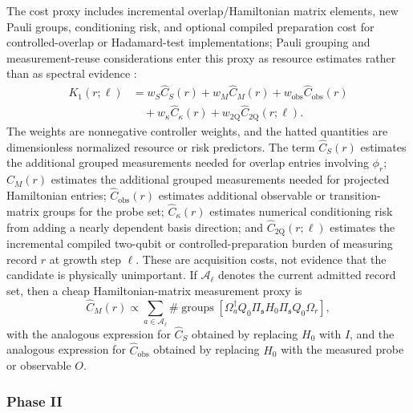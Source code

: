 \documentclass[
  reprint,
  amsmath,
  amssymb,
  aps,
  pra,
  nofootinbib,
  superscriptaddress,
  floatfix
]{revtex4-2}
\newcommand{\Acal}{\mathcal{A}}
\newcommand{\obs}{\mathrm{obs}}
\newcommand{\twq}{\mathrm{2Q}}
\begin{document}
The cost proxy includes incremental overlap/Hamiltonian matrix elements, new Pauli groups, conditioning risk, and optional compiled preparation cost for controlled-overlap or Hadamard-test implementations; Pauli grouping and measurement-reuse considerations enter this proxy as resource estimates rather than as spectral evidence \cite{Verteletskyi2020MeasurementGrouping}:
\begin{equation}
\begin{aligned}
K_1(r;\ell)
&=
w_S\widehat C_S(r)+w_M\widehat C_M(r)
+w_{\obs}\widehat C_{\obs}(r)\\
&\quad
+w_\kappa\widehat C_\kappa(r)
+w_{\twq}\widehat C_{\twq}(r;\ell).
\end{aligned}
\label{eq:qse_cost_proxy}
\end{equation}
The weights are nonnegative controller weights, and the hatted quantities are dimensionless normalized resource or risk predictors.  The term $\widehat C_S(r)$ estimates the additional grouped measurements needed for overlap entries involving $\phi_r$; $\widehat C_M(r)$ estimates the additional grouped measurements needed for projected Hamiltonian entries; $\widehat C_{\obs}(r)$ estimates additional observable or transition-matrix groups for the probe set; $\widehat C_\kappa(r)$ estimates numerical conditioning risk from adding a nearly dependent basis direction; and $\widehat C_{\twq}(r;\ell)$ estimates the incremental compiled two-qubit or controlled-preparation burden of measuring record $r$ at growth step $\ell$.  These are acquisition costs, not evidence that the candidate is physically unimportant.  If $\Acal_\ell$ denotes the current admitted record set, then a cheap Hamiltonian-matrix measurement proxy is
\begin{equation}
\widehat C_M(r)\propto
\sum_{a\in\Acal_\ell}
\#\operatorname{groups}\left[
\Omega_a^\dagger Q_0\Pi_{\mathfrak s}H_0\Pi_{\mathfrak s}Q_0\Omega_r
\right],
\label{eq:qse_matrix_cost_proxy}
\end{equation}
with the analogous expression for $\widehat C_S$ obtained by replacing $H_0$ with $I$, and the analogous expression for $\widehat C_{\obs}$ obtained by replacing $H_0$ with the measured probe or observable $O$.

\subsubsection{Phase II}
\end{document}
